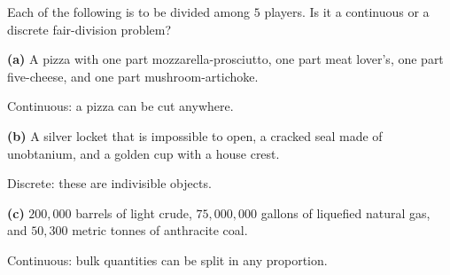 \documentclass[12pt]{ximera}
\begin{document}
\begin{problem}
Each of the following is to be divided among $5$ players. Is it a continuous or a
discrete fair-division problem?

\begin{prompt}
\textbf{(a)} A pizza with one part mozzarella-prosciutto, one part meat lover's, one part five-cheese, and one part mushroom-artichoke.
\begin{multipleChoice}
\end{multipleChoice}
\begin{feedback}
Continuous: a pizza can be cut anywhere.
\end{feedback}
\end{prompt}
\begin{prompt}
\textbf{(b)} A silver locket that is impossible to open, a cracked seal made of unobtanium, and a golden cup with a house crest.
\begin{multipleChoice}
\end{multipleChoice}
\begin{feedback}
Discrete: these are indivisible objects.
\end{feedback}
\end{prompt}
\begin{prompt}
\textbf{(c)} $200{,}000$ barrels of light crude, $75{,}000{,}000$ gallons of liquefied natural gas, and $50{,}300$ metric tonnes of anthracite coal.
\begin{multipleChoice}
\end{multipleChoice}
\begin{feedback}
Continuous: bulk quantities can be split in any proportion.
\end{feedback}
\end{prompt}
\end{problem}
\end{document}
